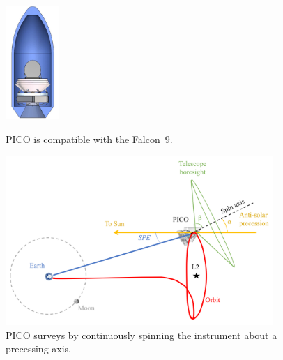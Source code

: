 \begin{figure}[!b]
  \begin{minipage}[b]{0.29\textwidth}
    \begin{center}
    \includegraphics[width=0.8in]{figures/InFairing.JPG}
\caption{\captiontext PICO is compatible with the Falcon~9.\label{fig:InFairing}}
    \end{center}
  \end{minipage}
%
\hfill
\begin{minipage}[b]{0.67\textwidth}
    \begin{center}
    \includegraphics[width=4in]{figures/MissionDesignFigure.png}
\caption{\captiontext
  PICO surveys by continuously spinning the instrument about a
  precessing axis.\label{fig:MissionDesignFigure}}
   \end{center}
  \end{minipage}
 
\end{figure}





